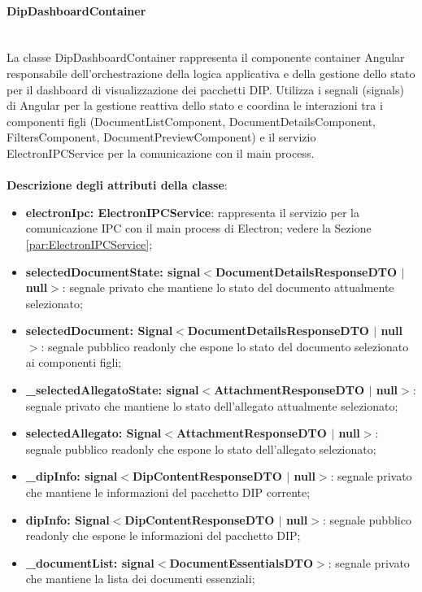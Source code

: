 \documentclass[a4paper,12pt]{article}
\begin{document}
{{{{                \paragraph{DipDashboardContainer}\label{par:DipDashboardContainer}\mbox{}\\
                La classe DipDashboardContainer rappresenta il componente container Angular responsabile dell'orchestrazione della logica applicativa e della gestione dello stato per il dashboard di visualizzazione dei pacchetti DIP. Utilizza i segnali (signals) di Angular per la gestione reattiva dello stato e coordina le interazioni tra i componenti figli (DocumentListComponent, DocumentDetailsComponent, FiltersComponent, DocumentPreviewComponent) e il servizio ElectronIPCService per la comunicazione con il main process.\\
                \\
                \textbf{Descrizione degli attributi della classe}:
                \begin{itemize}
                    \item \textbf{electronIpc: ElectronIPCService}: rappresenta il servizio per la comunicazione IPC con il main process di Electron; vedere la Sezione \ref{par:ElectronIPCService};
                    \item \textbf{selectedDocumentState: signal$<$DocumentDetailsResponseDTO $|$ null$>$}: segnale privato che mantiene lo stato del documento attualmente selezionato;
                    \item \textbf{selectedDocument: Signal$<$DocumentDetailsResponseDTO $|$ null$>$}: segnale pubblico readonly che espone lo stato del documento selezionato ai componenti figli;
                    \item \textbf{\_selectedAllegatoState: signal$<$AttachmentResponseDTO $|$ null$>$}: segnale privato che mantiene lo stato dell'allegato attualmente selezionato;
                    \item \textbf{selectedAllegato: Signal$<$AttachmentResponseDTO $|$ null$>$}: segnale pubblico readonly che espone lo stato dell'allegato selezionato;
                    \item \textbf{\_dipInfo: signal$<$DipContentResponseDTO $|$ null$>$}: segnale privato che mantiene le informazioni del pacchetto DIP corrente;
                    \item \textbf{dipInfo: Signal$<$DipContentResponseDTO $|$ null$>$}: segnale pubblico readonly che espone le informazioni del pacchetto DIP;
                    \item \textbf{\_documentList: signal$<$DocumentEssentialsDTO$>$}: segnale privato che mantiene la lista dei documenti essenziali;

\end{itemize}}}}}
\end{document}
